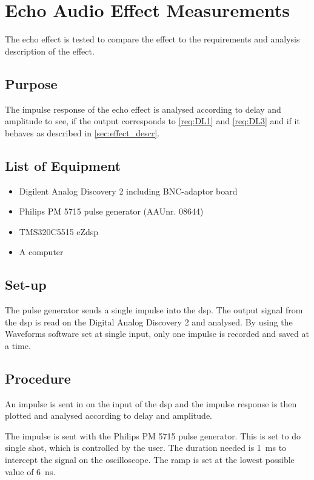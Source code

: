 \chapter{Echo Audio Effect Measurements}\label{ch:echo_meas_app}
The echo effect is tested to compare the effect to the requirements and analysis description of the effect.

\section{Purpose}
The impulse response of the echo effect is analysed according to delay and amplitude to see, if the output corresponds to \autoref{req:DL1} and \autoref{req:DL3} and if it behaves as described in \autoref{sec:effect_descr}.

\section{List of Equipment}
\begin{itemize}
	\item Digilent Analog Discovery 2 including BNC-adaptor board
	\item Philips PM 5715 pulse generator (AAUnr. 08644)
	\item TMS320C5515 eZdsp
	\item A computer
\end{itemize}

\section{Set-up}
The pulse generator sends a single impulse into the \gls{dsp}. The output signal from the \gls{dsp} is read on the Digital Analog Discovery 2 and analysed. By using the Waveforms software set at single input, only one impulse is recorded and saved at a time.

\section{Procedure}
An impulse is sent in on the input of the \gls{dsp} and the impulse response is then plotted and analysed according to delay and amplitude.

The impulse is sent with the Philips PM 5715 pulse generator. This is set to do single shot, which is controlled by the user. The duration needed is \SI{1}{\milli\second} to intercept the signal on the oscilloscope. The ramp is set at the lowest possible value of \SI{6}{\nano\second}.

